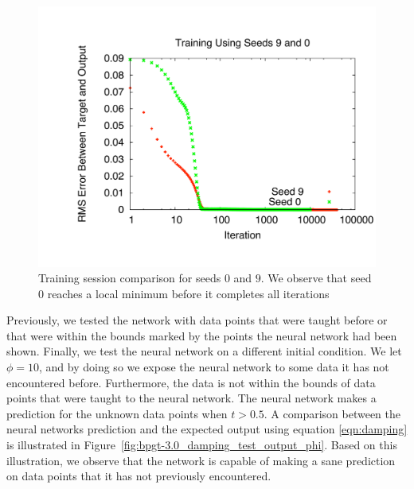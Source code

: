 \documentclass[11pt]{article}
\begin{document}
\begin{figure}[htbp]
	\centering
		\includegraphics[width=0.85\columnwidth]{../bpgt-3.0/damping_test/Trainings.pdf}
	\caption{Training session comparison for seeds $0$ and $9$. We observe that seed $0$ reaches a local minimum before it completes all iterations}
	\label{fig:bpgt-3.0_damping_test_Trainings}
\end{figure}

Previously, we tested the network with data points that were taught before or that were within the bounds marked by the points the
neural network had been shown. Finally, we test the neural network on a different initial condition. We let $\phi=10$, and by doing so
we expose the neural network to some data it has not encountered before. Furthermore, the data is not within the bounds of data points
that were taught to the neural network. The neural network makes a prediction for the unknown data points when $t > 0.5$. A comparison
between the neural networks prediction and the expected output using equation \ref{eqn:damping} is illustrated in
Figure~\ref{fig:bpgt-3.0_damping_test_output_phi}. Based on this illustration, we observe that the network is capable of making a sane
prediction on data points that it has not previously encountered.
\end{document}
